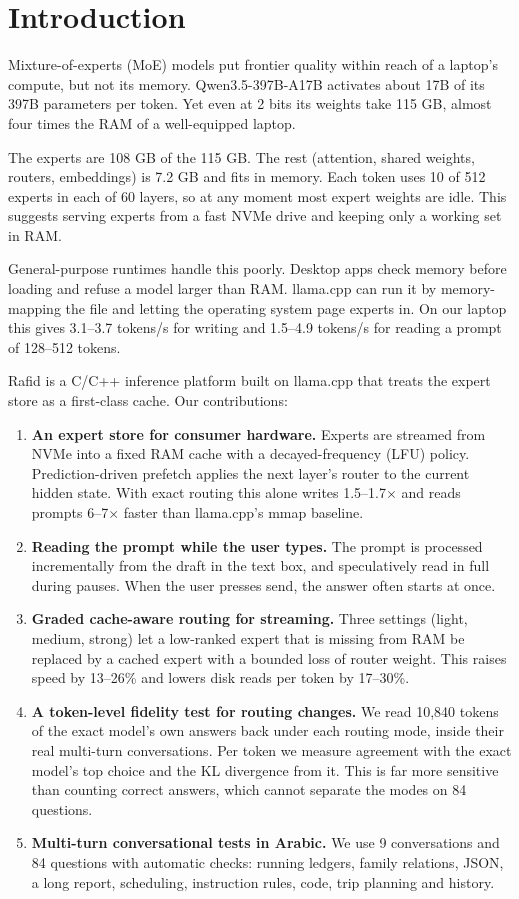 \section{Introduction}
Mixture-of-experts (MoE) models put frontier quality within reach of a laptop's compute, but not its memory. Qwen3.5-397B-A17B activates about 17B of its 397B parameters per token. Yet even at 2 bits its weights take 115 GB, almost four times the RAM of a well-equipped laptop.

The experts are 108 GB of the 115 GB. The rest (attention, shared weights, routers, embeddings) is 7.2 GB and fits in memory. Each token uses 10 of 512 experts in each of 60 layers, so at any moment most expert weights are idle. This suggests serving experts from a fast NVMe drive and keeping only a working set in RAM.

General-purpose runtimes handle this poorly. Desktop apps check memory before loading and refuse a model larger than RAM. llama.cpp can run it by memory-mapping the file and letting the operating system page experts in. On our laptop this gives 3.1--3.7 tokens/s for writing and 1.5--4.9 tokens/s for reading a prompt of 128--512 tokens.

Rafid is a C/C++ inference platform built on llama.cpp that treats the expert store as a first-class cache. Our contributions:

\begin{enumerate}
  \item \textbf{An expert store for consumer hardware.} Experts are streamed from NVMe into a fixed RAM cache with a decayed-frequency (LFU) policy. Prediction-driven prefetch applies the next layer's router to the current hidden state. With exact routing this alone writes 1.5--1.7$\times$ and reads prompts 6--7$\times$ faster than llama.cpp's mmap baseline.
  \item \textbf{Reading the prompt while the user types.} The prompt is processed incrementally from the draft in the text box, and speculatively read in full during pauses. When the user presses send, the answer often starts at once.
  \item \textbf{Graded cache-aware routing for streaming.} Three settings (light, medium, strong) let a low-ranked expert that is missing from RAM be replaced by a cached expert with a bounded loss of router weight. This raises speed by 13--26\% and lowers disk reads per token by 17--30\%.
  \item \textbf{A token-level fidelity test for routing changes.} We read 10,840 tokens of the exact model's own answers back under each routing mode, inside their real multi-turn conversations. Per token we measure agreement with the exact model's top choice and the KL divergence from it. This is far more sensitive than counting correct answers, which cannot separate the modes on 84 questions.
  \item \textbf{Multi-turn conversational tests in Arabic.} We use 9 conversations and 84 questions with automatic checks: running ledgers, family relations, JSON, a long report, scheduling, instruction rules, code, trip planning and history.
\end{enumerate}

